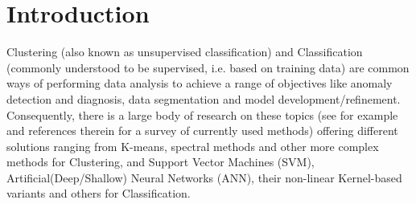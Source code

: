 \documentclass{article}
\begin{document}
 





\begin{abstract} 



\end{abstract} 


\section{Introduction}




Clustering (also known as unsupervised classification) and Classification (commonly understood to be supervised,
 i.e. based on training data) are common ways of performing data analysis to achieve a range of objectives like 
anomaly detection and diagnosis, data segmentation and model development/refinement. Consequently, there is a 
large body of research on these topics (see for example\cite{Hastie} and references therein for a survey of 
currently used methods) offering different solutions ranging from K-means, spectral methods and other more 
complex methods for Clustering, and Support Vector Machines (SVM), Artificial(Deep/Shallow) Neural Networks (ANN), their 
non-linear Kernel-based variants and others for Classification.
\end{document}
